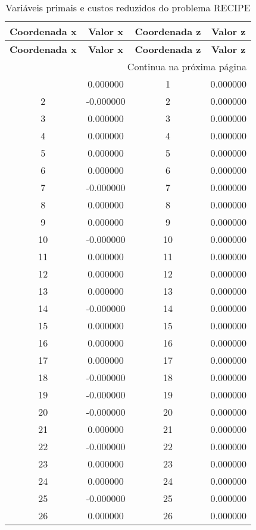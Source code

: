 \documentclass[12pt]{article}
\begin{document}
\begin{longtable}{@{}cccc@{}}
\caption{Variáveis primais e custos reduzidos do problema RECIPE} \\
\toprule
\textbf{Coordenada x} & \textbf{Valor x} & \textbf{Coordenada z} & \textbf{Valor z} \\
\midrule
\endfirsthead

\toprule
\textbf{Coordenada x} & \textbf{Valor x} & \textbf{Coordenada z} & \textbf{Valor z} \\
\midrule
\endhead

\midrule \multicolumn{4}{r}{{Continua na próxima página}} \\ \midrule
\endfoot

\bottomrule
\endlastfoot
1 & 0.000000 & 1 & 0.000000 \\
2 & -0.000000 & 2 & 0.000000 \\
3 & 0.000000 & 3 & 0.000000 \\
4 & 0.000000 & 4 & 0.000000 \\
5 & 0.000000 & 5 & 0.000000 \\
6 & 0.000000 & 6 & 0.000000 \\
7 & -0.000000 & 7 & 0.000000 \\
8 & 0.000000 & 8 & 0.000000 \\
9 & 0.000000 & 9 & 0.000000 \\
10 & -0.000000 & 10 & 0.000000 \\
11 & 0.000000 & 11 & 0.000000 \\
12 & 0.000000 & 12 & 0.000000 \\
13 & 0.000000 & 13 & 0.000000 \\
14 & -0.000000 & 14 & 0.000000 \\
15 & 0.000000 & 15 & 0.000000 \\
16 & 0.000000 & 16 & 0.000000 \\
17 & 0.000000 & 17 & 0.000000 \\
18 & -0.000000 & 18 & 0.000000 \\
19 & -0.000000 & 19 & 0.000000 \\
20 & -0.000000 & 20 & 0.000000 \\
21 & 0.000000 & 21 & 0.000000 \\
22 & -0.000000 & 22 & 0.000000 \\
23 & 0.000000 & 23 & 0.000000 \\
24 & 0.000000 & 24 & 0.000000 \\
25 & -0.000000 & 25 & 0.000000 \\
26 & 0.000000 & 26 & 0.000000 \\

\end{longtable}
\end{document}
